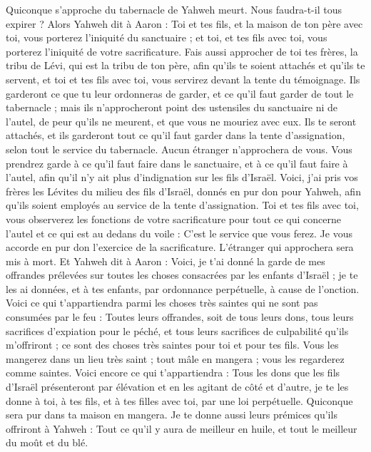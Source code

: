 \begin{multicols}{2}
Quiconque s'approche du tabernacle de Yahweh meurt. Nous faudra-t-il tous expirer ?
\VerseOne{}Alors Yahweh dit à Aaron : Toi et tes fils, et la maison de ton père avec toi, vous porterez l’iniquité du sanctuaire ; et toi, et tes fils avec toi, vous porterez l’iniquité de votre sacrificature.
Fais aussi approcher de toi tes frères, la tribu de Lévi, qui est la tribu de ton père, afin qu'ils te soient attachés et qu'ils te servent, et toi et tes fils avec toi, vous servirez devant la tente du témoignage.
Ils garderont ce que tu leur ordonneras de garder, et ce qu'il faut garder de tout le tabernacle ; mais ils n'approcheront point des ustensiles du sanctuaire ni de l'autel, de peur qu'ils ne meurent, et que vous ne mouriez avec eux.
Ils te seront attachés, et ils garderont tout ce qu'il faut garder dans la tente d'assignation, selon tout le service du tabernacle. Aucun étranger n'approchera de vous.
Vous prendrez garde à ce qu'il faut faire dans le sanctuaire, et à ce qu'il faut faire à l'autel, afin qu'il n'y ait plus d'indignation sur les fils d'Israël.
Voici, j'ai pris vos frères les Lévites du milieu des fils d'Israël, donnés en pur don pour Yahweh, afin qu'ils soient employés au service de la tente d'assignation.
Toi et tes fils avec toi, vous observerez les fonctions de votre sacrificature pour tout ce qui concerne l'autel et ce qui est au dedans du voile : C’est le service que vous ferez. Je vous accorde en pur don l’exercice de la sacrificature. L’étranger qui approchera sera mis à mort.
Et Yahweh dit à Aaron : Voici, je t'ai donné la garde de mes offrandes prélevées sur toutes les choses consacrées par les enfants d'Israël ; je te les ai données, et à tes enfants, par ordonnance perpétuelle, à cause de l'onction.
Voici ce qui t'appartiendra parmi les choses très saintes qui ne sont pas consumées par le feu : Toutes leurs offrandes, soit de tous leurs dons, tous leurs sacrifices d’expiation pour le péché, et tous leurs sacrifices de culpabilité qu’ils m’offriront ; ce sont des choses très saintes pour toi et pour tes fils.
Vous les mangerez dans un lieu très saint ; tout mâle en mangera ; vous les regarderez comme saintes.
Voici encore ce qui t'appartiendra : Tous les dons que les fils d'Israël présenteront par élévation et en les agitant de côté et d’autre, je te les donne à toi, à tes fils, et à tes filles avec toi, par une loi perpétuelle. Quiconque sera pur dans ta maison en mangera.
Je te donne aussi leurs prémices qu'ils offriront à Yahweh : Tout ce qu’il y aura de meilleur en huile, et tout le meilleur du moût et du blé.

\end{multicols}
